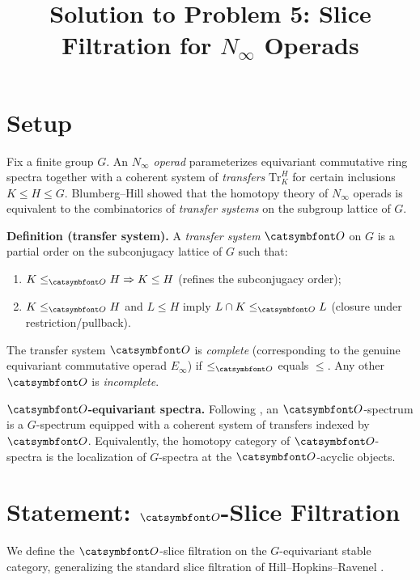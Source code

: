

\title{Solution to Problem 5: Slice Filtration for $N_\infty$ Operads}
\date{}


\maketitle

\section*{Setup}

Fix a finite group $G$.  An \emph{$N_\infty$ operad} parameterizes equivariant commutative ring spectra together with a coherent system of \emph{transfers} $\mathrm{Tr}^H_K$ for certain inclusions $K\le H\le G$.  Blumberg--Hill \cite{BH15} showed that the homotopy theory of $N_\infty$ operads is equivalent to the combinatorics of \emph{transfer systems} on the subgroup lattice of $G$.

\medskip
\noindent\textbf{Definition (transfer system).}  A \emph{transfer system} $\aO$ on $G$ is a partial order on the subconjugacy lattice of $G$ such that:
\begin{enumerate}\setlength\itemsep{2pt}
\item $K\le_\aO H\Rightarrow K\le H$ (refines the subconjugacy order);
\item $K\le_\aO H$ and $L\le H$ imply $L\cap K\le_\aO L$ (closure under restriction/pullback).
\end{enumerate}
The transfer system $\aO$ is \emph{complete} (corresponding to the genuine equivariant commutative operad $E_\infty$) if $\le_\aO$ equals $\le$.  Any other $\aO$ is \emph{incomplete}.

\medskip
\noindent\textbf{$\aO$-equivariant spectra.}  Following \cite{BH18}, an $\aO$-spectrum is a $G$-spectrum equipped with a coherent system of transfers indexed by $\aO$.  Equivalently, the homotopy category of $\aO$-spectra is the localization of $G$-spectra at the $\aO$-acyclic objects.

\section*{Statement: $\aO$-Slice Filtration}

We define the $\aO$-slice filtration on the $G$-equivariant stable category, generalizing the standard slice filtration of Hill--Hopkins--Ravenel \cite{HHR16}.

